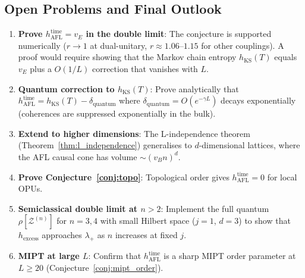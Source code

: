\documentclass[12pt,a4paper]{article}
\begin{document}
\subsection{Open Problems and Final Outlook}
\label{subsec:open_problems_final}

\begin{enumerate}
  \item \textbf{Prove $h_{\mathrm{AFL}}^{\mathrm{time}} = v_E$
    in the double limit}: The conjecture is supported numerically
    ($r \to 1$ at dual-unitary, $r \approx 1.06$--$1.15$ for other
    couplings).  A proof would require showing that the Markov chain
    entropy $h_{\mathrm{KS}}(T)$ equals $v_E$ plus a $O(1/L)$ correction
    that vanishes with $L$.

  \item \textbf{Quantum correction to $h_{\mathrm{KS}}(T)$}: Prove
    analytically that $h_{\mathrm{AFL}}^{\mathrm{time}} = h_{\mathrm{KS}}(T)
    - \delta_{\mathrm{quantum}}$ where
    $\delta_{\mathrm{quantum}} = O(e^{-\gamma L})$ decays exponentially
    (coherences are suppressed exponentially in the bulk).

  \item \textbf{Extend to higher dimensions}: The L-independence theorem
    (Theorem~\ref{thm:l_independence}) generalises to $d$-dimensional
    lattices, where the AFL causal cone has volume $\sim (v_B n)^d$.

  \item \textbf{Prove Conjecture~\ref{conj:topo}}: Topological order
    gives $h_{\mathrm{AFL}}^{\mathrm{time}} = 0$ for local OPUs.

  \item \textbf{Semiclassical double limit at $n > 2$}: Implement the
    full quantum $\rho[\mathcal{Z}^{(n)}]$ for $n=3,4$ with small
    Hilbert space ($j=1$, $d=3$) to show that $h_{\mathrm{excess}}$
    approaches $\lambda_+$ as $n$ increases at fixed $j$.

  \item \textbf{MIPT at large $L$}: Confirm that
    $h_{\mathrm{AFL}}^{\mathrm{time}}$ is a sharp MIPT order parameter
    at $L \geq 20$ (Conjecture~\ref{conj:mipt_order}).
\end{enumerate}
\end{document}
